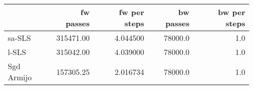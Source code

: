 \begin{tabular}{lrrrr}
\toprule
{} &  fw passes &  fw per steps &  bw passes &  bw per steps \\
\midrule
sa-SLS     &  315471.00 &      4.044500 &    78000.0 &           1.0 \\
l-SLS      &  315042.00 &      4.039000 &    78000.0 &           1.0 \\
Sgd Armijo &  157305.25 &      2.016734 &    78000.0 &           1.0 \\
\bottomrule
\end{tabular}
